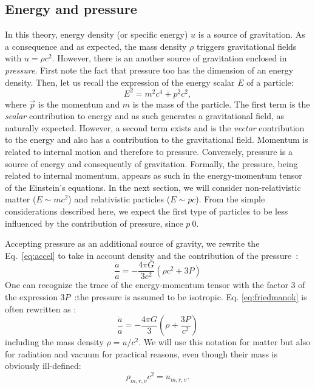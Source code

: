 \subsection{Energy and pressure} %
\label{sub:energy_and_pressure}
In this theory, energy density (or specific energy) $u$ is a source of gravitation. As a consequence and as expected, the mass density $\rho$ triggers gravitational fields with $u=\rho c^2$. However, there is an another source of gravitation enclosed in \emph{pressure}. First note the fact that pressure too has the dimension of an energy density. Then, let us recall the expression of the energy scalar $E$ of a particle:
\begin{equation}
	E^2=m^2c^4+p^2c^2,
\end{equation}
where $\vec p$ is the momentum and $m$ is the mass of the particle. The first term is the \emph{scalar} contribution to energy and as such generates a gravitational field, as naturally expected. However, a second term exists and is the \emph{vector} contribution to the energy and also has a contribution to the gravitational field. Momentum is related to internal motion and therefore to pressure. Conversely, pressure is a source of energy and consequently of gravitation. Formally, the pressure, being related to internal momentum, appears as such in the energy-momentum tensor of the Einstein's equations. In the next section, we will consider non-relativistic matter ($E\sim mc^2$) and relativistic particles ($E\sim  pc$). From the simple considerations described here, we expect the first type of particles to be less influenced by the contribution of pressure, since $p~0$.

Accepting pressure as an additional source of gravity, we rewrite the Eq.~\ref{eq:accel} to take in account density and the contribution of the pressure~:
\begin{equation}
		\frac{\ddot a}{a}=-\frac{4\pi G}{3c^2}(\rho c^2+3P)
		\label{eq:friedmanok}
\end{equation}
One can recognize the trace of the energy-momentum tensor with the factor 3 of the expression $3P$~:the pressure is assumed to be isotropic. Eq. \ref{eq:friedmanok} is often rewritten as :
\begin{equation}
			\frac{\ddot a}{a}=-\frac{4\pi G}{3}(\rho+\frac{3P}{c^2})
		\label{eq:friedmanok2}
\end{equation}
including the mass density $\rho=u/c^2$. We will use this notation for matter but also for radiation and vacuum for practical reasons, even though their mass is obviously ill-defined:
\begin{equation}
	\rho_{m,r,v}c^2=u_{m,r,v}.
\end{equation}

